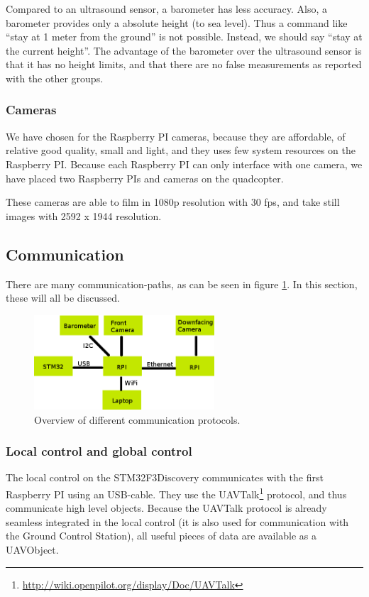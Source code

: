 \documentclass[11pt, a4paper, onecolumn, oneside, parskip=half]{scrartcl}
\begin{document}
Compared to an ultrasound sensor, a barometer has less accuracy. Also, a barometer provides only a absolute height (to sea level). Thus a command like ``stay at 1 meter from the ground'' is not possible. Instead, we should say ``stay at the current height''. The advantage of the barometer over the ultrasound sensor is that it has no height limits, and that there are no false measurements as reported with the other groups.

\subsubsection{Cameras}
We have chosen for the Raspberry PI cameras, because they are affordable, of relative good quality, small and light, and they uses few system resources on the Raspberry PI. Because each Raspberry PI can only interface with one camera, we have placed two Raspberry PIs and cameras on the quadcopter.

These cameras are able to film in 1080p resolution with 30 fps, and take still images with 2592 x 1944 resolution.

\subsection{Communication}
There are many communication-paths, as can be seen in figure \ref{fig:communication}. In this section, these will all be discussed.

\begin{figure}[ht]
\centering
\includegraphics[width=0.6\textwidth]{hwdesign2}
\caption{Overview of different communication protocols.}
\label{fig:communication}
\end{figure}

\subsubsection{Local control and global control}
\label{sec:arch:comm:localglobal}
The local control on the STM32F3Discovery communicates with the first Raspberry PI using an USB-cable. They use the UAVTalk\footnote{\url{http://wiki.openpilot.org/display/Doc/UAVTalk}} protocol, and thus communicate high level objects. Because the UAVTalk protocol is already seamless integrated in the local control (it is also used for communication with the Ground Control Station), all useful pieces of data are available as a UAVObject.
\end{document}

